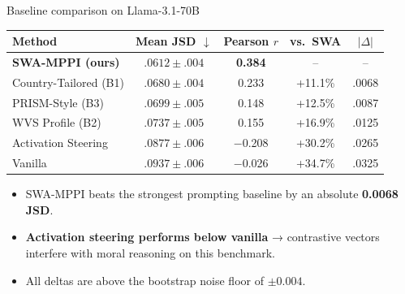 \documentclass[10pt,aspectratio=169]{beamer}
\begin{document}
\begin{frame}{Baseline comparison on Llama-3.1-70B}
  \centering\small
  \begin{tabular}{lcccc}
    \toprule
    \textbf{Method} & \textbf{Mean JSD} $\downarrow$ & \textbf{Pearson $r$} & \textbf{vs.\ SWA} & \textbf{$|\Delta|$} \\
    \midrule
    \textbf{SWA-MPPI (ours)}    & $\mathbf{.0612\!\pm\!.004}$ & \textbf{0.384}  & --      & -- \\
    Country-Tailored (B1)        & $.0680\!\pm\!.004$ & 0.233           & +11.1\% & .0068 \\
    PRISM-Style (B3)             & $.0699\!\pm\!.005$ & 0.148           & +12.5\% & .0087 \\
    WVS Profile (B2)             & $.0737\!\pm\!.005$ & 0.155           & +16.9\% & .0125 \\
    Activation Steering          & $.0877\!\pm\!.006$ & $-$0.208        & +30.2\% & .0265 \\
    Vanilla                      & $.0937\!\pm\!.006$ & $-$0.026        & +34.7\% & .0325 \\
    \bottomrule
  \end{tabular}
  \vspace{0.4em}

  \begin{itemize}\small
    \item SWA-MPPI beats the strongest prompting baseline by an absolute \textbf{0.0068 JSD}.
    \item \textbf{Activation steering performs below vanilla} → contrastive vectors interfere with moral reasoning on this benchmark.
    \item All deltas are above the bootstrap noise floor of $\pm 0.004$.
  \end{itemize}
\end{frame}
\end{document}
